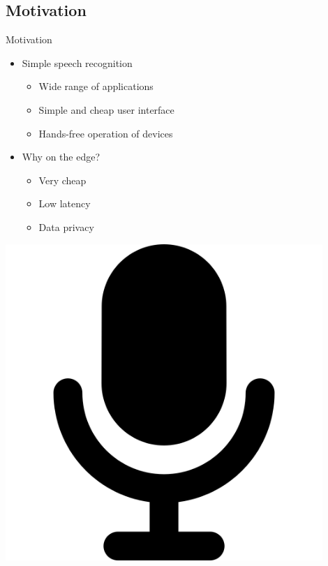 \documentclass{beamer}
\begin{document}
\subsection{Motivation}
\begin{frame}{Motivation}
	\begin{minipage}{0.67\textwidth}
	\begin{itemize}
		\item<2->Simple speech recognition
			\begin{itemize}
				\item<3-> Wide range of applications
				\item<4-> Simple and cheap user interface
				\item<5-> Hands-free operation of devices
			\end{itemize}\vspace{5mm}

		\item<6-> Why on the edge?
			\begin{itemize}
				\item<7-> Very cheap
				\item<8-> Low latency
				\item<9-> Data privacy
			\end{itemize}
			\end{itemize}
	\end{minipage}
	\begin{minipage}{0.24\textwidth}
		\includegraphics[width=0.9\textwidth]{figures/microphone.png}
	\end{minipage}
\end{frame}
\end{document}
